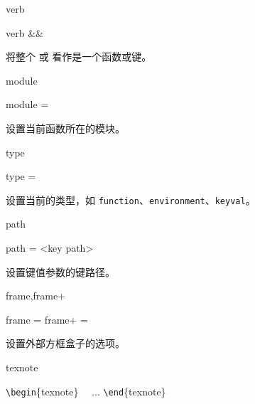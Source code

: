 \documentclass{cusdoc}
\begin{document}
\begin{keyval}[path=doc/function]{verb}
  \begin{syntax}
    verb &&
  \end{syntax}
将整个  或  看作是一个函数或键。
\end{keyval}

\begin{keyval}[path=doc/function]{module}
  \begin{syntax}
    module = 
  \end{syntax}
设置当前函数所在的模块。
\end{keyval}

\begin{keyval}[path=doc/function]{type}
  \begin{syntax}
    type = 
  \end{syntax}
设置当前的类型，如 \texttt{function}、\texttt{environment}、\texttt{keyval}。
\end{keyval}


\begin{keyval}[path=doc/function]{path}
  \begin{syntax}
    path = <{key path}>
  \end{syntax}
设置键值参数的键路径。
\end{keyval}

\begin{keyval}[path=doc/function]{frame,frame+}
  \begin{syntax}
    frame  = 
    frame+ = 
  \end{syntax}
设置外部方框盒子的选项。
\end{keyval}

\begin{function}[type=environment]{texnote}
  \begin{syntax}
    \verb|\begin|\{texnote\}
    ~~... 
    \verb|\end|\{texnote\}
  \end{syntax}
\end{function}
\end{document}
